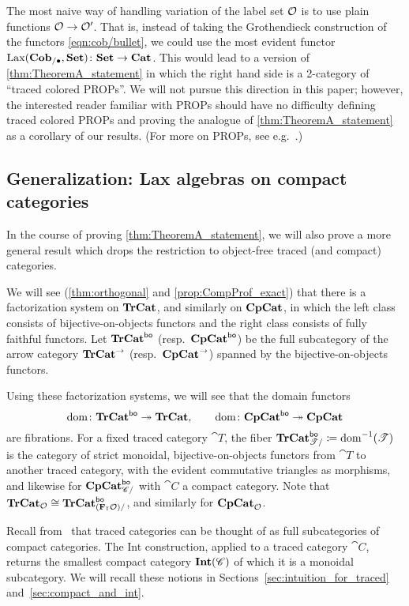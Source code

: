 \documentclass[11pt,oneside,article]{memoir}
\begin{document}
\begin{remark}
   The most naive way of handling variation of the label set $\mathcal{O}$ is to use plain functions
   $\mathcal{O}\to\mathcal{O}'$. That is, instead of taking the Grothendieck construction of the functors
   \eqref{eqn:cob/bullet}, we could use the most evident functor
   $\operatorname{Lax}(\mathbf{Cob}_{/\bullet},\mathbf{Set})\colon\mathbf{Set}\to\mathbf{Cat}$. This would lead to a version of
   \ref{thm:TheoremA_statement} in which the right hand side is a 2-category of ``traced colored
   PROPs''. We will not pursue this direction in this paper; however, the interested reader familiar
   with PROPs should have no difficulty defining traced colored PROPs and proving the analogue of
   \ref{thm:TheoremA_statement} as a corollary of our results. (For more on PROPs, see
   e.g.~\cite{HackneyRobertson}.)
\end{remark}

\subsection{Generalization: Lax algebras on compact categories}

In the course of proving \ref{thm:TheoremA_statement}, we will also prove a more general result
which drops the restriction to object-free traced (and compact) categories.

We will see (\ref{thm:orthogonal} and \ref{prop:CompProf_exact}) that there is a factorization
system on $\mathbf{TrCat}$, and similarly on $\mathbf{CpCat}$, in which the left class consists of
bijective-on-objects functors and the right class consists of fully faithful functors. Let
$\mathbf{TrCat}^{\mathsf{bo}}$ (resp.~$\mathbf{CpCat}^{\mathsf{bo}}$) be the full subcategory of the arrow category $\mathbf{TrCat}^{\to}$
(resp.~$\mathbf{CpCat}^{\to}$) spanned by the bijective-on-objects functors.

Using these factorization systems, we will see that the domain functors
$$\operatorname{dom}\colon\mathbf{TrCat}^{\mathsf{bo}}\twoheadrightarrow\mathbf{TrCat},\qquad\operatorname{dom}\colon\mathbf{CpCat}^{\mathsf{bo}}\twoheadrightarrow\mathbf{CpCat}$$
are fibrations. For a fixed traced category $\cat{T}$, the fiber
$\mathbf{TrCat}^{\mathsf{bo}}_{\mathscr{T}/}\coloneqq\operatorname{dom}^{-1}(\mathscr{T})$ is the category of strict monoidal,
bijective-on-objects functors from $\cat{T}$ to another traced category, with the evident
commutative triangles as morphisms, and likewise for $\mathbf{CpCat}^{\mathsf{bo}}_{\mathscr{C}/}$ with $\cat{C}$ a
compact category. Note that $\mathbf{TrCat}_{\mathcal{O}}\cong\mathbf{TrCat}^{\mathsf{bo}}_{(\mathbf{F}_{\mathsf{T}}\mathcal{O})/}$, and similarly for
$\mathbf{CpCat}_{\mathcal{O}}$.

Recall from~\cite{JoyalStreetVerity} that traced categories can be thought of as full subcategories
of compact categories.  The Int construction, applied to a traced category $\cat{C}$, returns the
smallest compact category $\mathbf{Int}(\mathscr{C})$ of which it is a monoidal subcategory. We will recall these
notions in Sections~\ref{sec:intuition_for_traced} and~\ref{sec:compact_and_int}.
\end{document}
